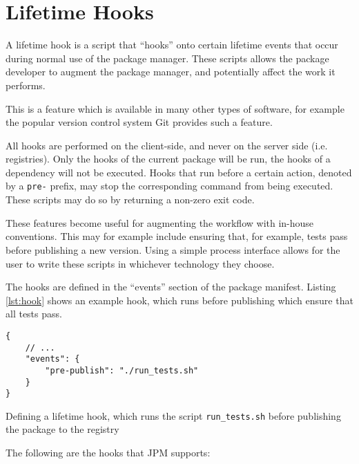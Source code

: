 \section{Lifetime Hooks}
\label{sec:lifetime_hooks}

A lifetime hook is a script that ``hooks'' onto certain lifetime events that
occur during normal use of the package manager. These scripts allows the
package developer to augment the package manager, and potentially affect the
work it performs.

This is a feature which is available in many other types of software, for
example the popular version control system Git\autocite{chacon2009pro} provides
such a feature.

All hooks are performed on the client-side, and never on the server side (i.e.
registries). Only the hooks of the current package will be run, the
hooks of a dependency will not be executed. Hooks that run before a certain
action, denoted by a \verb!pre-! prefix, may stop the corresponding command
from being executed.  These scripts may do so by returning a non-zero exit
code.

These features become useful for augmenting the workflow with in-house
conventions. This may for example include ensuring that, for example, tests
pass before publishing a new version. Using a simple process interface allows
for the user to write these scripts in whichever technology they choose.

The hooks are defined in the ``events'' section of the package manifest.
Listing \ref{lst:hook} shows an example hook, which runs before publishing
which ensure that all tests pass.

\begin{listing}[H]
\begin{verbatim}
{
    // ...
    "events": {
        "pre-publish": "./run_tests.sh"
    }
}
\end{verbatim}

\caption{Defining a lifetime hook, which runs the script
    \texttt{run_tests.sh} before publishing the package to the
        registry}

\label{lst:hook}

\end{listing}

The following are the hooks that JPM supports:

